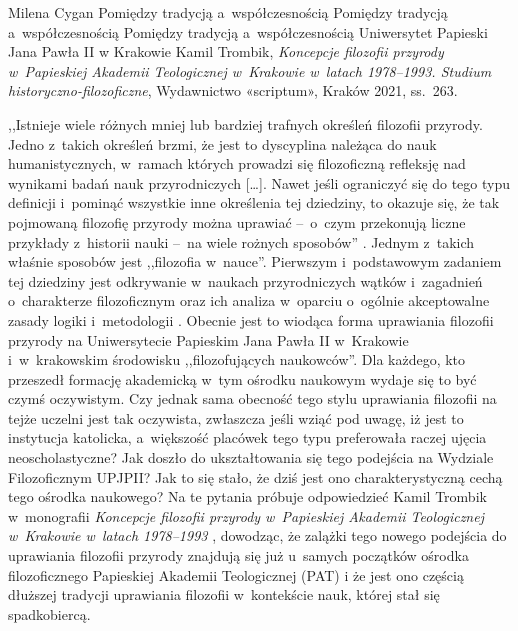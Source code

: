 \begin{newrevplenv}{Milena Cygan}
	{Pomiędzy tradycją a~współczesnością}
	{Pomiędzy tradycją a~współczesnością}
	{Pomiędzy tradycją a~współczesnością}
	{Uniwersytet Papieski Jana Pawła II w Krakowie}
	{Kamil Trombik, \textit{Koncepcje filozofii przyrody w~Papieskiej Akademii Teologicznej w~Krakowie w~latach 1978--1993. Studium historyczno-filozoficzne}, Wydawnictwo «scriptum», Kraków 2021, ss.~263.}




\lettrine[loversize=0.13,lines=2,lraise=-0.03,nindent=0em,findent=0.2pt]%
{,,I}{}stnieje wiele różnych mniej lub bardziej trafnych określeń filozofii przyrody. Jedno z~takich określeń brzmi, że jest to dyscyplina należąca do nauk humanistycznych, w~ramach których prowadzi się filozoficzną refleksję nad wynikami badań nauk przyrodniczych […]. Nawet jeśli ograniczyć się do tego typu definicji i~pominąć wszystkie inne określenia tej dziedziny, to okazuje się, że tak pojmowaną filozofię przyrody można uprawiać --~o~czym przekonują liczne przykłady z~historii nauki --~na wiele rożnych sposobów''
\parencite[][s.~12]{heller_elementy_2007}. %
 Jednym z~takich właśnie sposobów jest ,,filozofia w~nauce''. Pierwszym i~podstawowym zadaniem tej dziedziny jest odkrywanie w~naukach przyrodniczych wątków i~zagadnień o~charakterze filozoficznym oraz ich analiza w~oparciu o~ogólnie akceptowalne zasady logiki i~metodologii 
\parencites[][]{heller_how_2019}[zob. także][]{polak_philosophy_2019}. %
Obecnie jest to wiodąca forma uprawiania filozofii przyrody na Uniwersytecie Papieskim Jana Pawła II w~Krakowie i~w~krakowskim środowisku ,,filozofujących naukowców''. Dla każdego, kto przeszedł formację akademicką w~tym ośrodku naukowym wydaje się to być czymś oczywistym. Czy jednak sama obecność tego stylu uprawiania filozofii na tejże uczelni jest tak oczywista, zwłaszcza jeśli wziąć pod uwagę, iż jest to instytucja katolicka, a~większość placówek tego typu preferowała raczej ujęcia neoscholastyczne? Jak doszło do ukształtowania się tego podejścia na Wydziale Filozoficznym UPJPII? Jak to się stało, że dziś jest ono charakterystyczną cechą tego ośrodka naukowego? Na te pytania próbuje odpowiedzieć Kamil Trombik w~monografii \textit{Koncepcje filozofii przyrody w~Papieskiej Akademii Teologicznej w~Krakowie w~latach 1978--1993}
\parencite*[][]{trombik_koncepcje_2021}, %
 dowodząc, że zalążki tego nowego podejścia do uprawiania filozofii przyrody znajdują się już u~samych początków ośrodka filozoficznego Papieskiej Akademii Teologicznej (PAT) i że jest ono częścią dłuższej tradycji uprawiania filozofii w~kontekście nauk, której stał się  spadkobiercą.


\end{newrevplenv}
